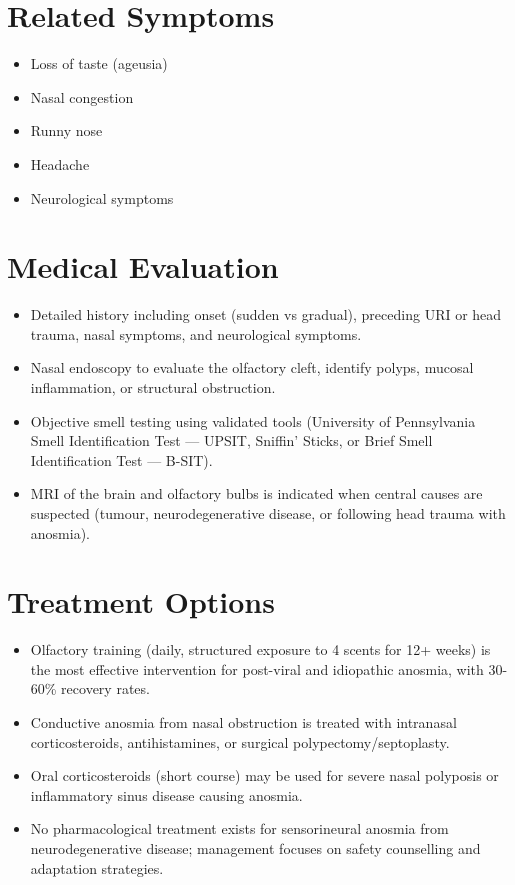 \section*{Related Symptoms}
\begin{itemize}
  \item Loss of taste (ageusia)
  \item Nasal congestion
  \item Runny nose
  \item Headache
  \item Neurological symptoms
\end{itemize}

\section*{Medical Evaluation}
\begin{itemize}
  \item Detailed history including onset (sudden vs gradual), preceding URI or head trauma, nasal symptoms, and neurological symptoms.
  \item Nasal endoscopy to evaluate the olfactory cleft, identify polyps, mucosal inflammation, or structural obstruction.
  \item Objective smell testing using validated tools (University of Pennsylvania Smell Identification Test — UPSIT, Sniffin' Sticks, or Brief Smell Identification Test — B-SIT).
  \item MRI of the brain and olfactory bulbs is indicated when central causes are suspected (tumour, neurodegenerative disease, or following head trauma with anosmia).
\end{itemize}

\section*{Treatment Options}
\begin{itemize}
  \item Olfactory training (daily, structured exposure to 4 scents for 12+ weeks) is the most effective intervention for post-viral and idiopathic anosmia, with 30-60\% recovery rates.
  \item Conductive anosmia from nasal obstruction is treated with intranasal corticosteroids, antihistamines, or surgical polypectomy/septoplasty.
  \item Oral corticosteroids (short course) may be used for severe nasal polyposis or inflammatory sinus disease causing anosmia.
  \item No pharmacological treatment exists for sensorineural anosmia from neurodegenerative disease; management focuses on safety counselling and adaptation strategies.
\end{itemize}

